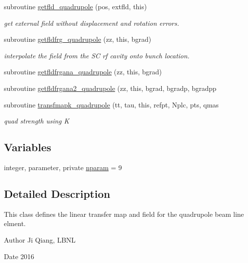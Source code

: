 \begin{DoxyCompactItemize}
subroutine \mbox{\hyperlink{namespacequadrupoleclass_a1d1bf0b4ea88a1cd0c0832a178fc80e5}{getfld\+\_\+quadrupole}} (pos, extfld, this)
\begin{DoxyCompactList}\small\item\em get external field without displacement and rotation errors. \end{DoxyCompactList}\item 
subroutine \mbox{\hyperlink{namespacequadrupoleclass_a28a961157d94669d59f8c6f024995899}{getfldfrg\+\_\+quadrupole}} (zz, this, bgrad)
\begin{DoxyCompactList}\small\item\em interpolate the field from the SC rf cavity onto bunch location. \end{DoxyCompactList}\item 
subroutine \mbox{\hyperlink{namespacequadrupoleclass_aac2c756ddd587ca842555670b0ad16b3}{getfldfrgana\+\_\+quadrupole}} (zz, this, bgrad)
\item 
subroutine \mbox{\hyperlink{namespacequadrupoleclass_ab1abe8916ad3dace3e5d1373da4688ac}{getfldfrgana2\+\_\+quadrupole}} (zz, this, bgrad, bgradp, bgradpp
\item 
subroutine \mbox{\hyperlink{namespacequadrupoleclass_a0a62a19a637c00cb1d985698e111b415}{transfmapk\+\_\+quadrupole}} (tt, tau, this, refpt, Nplc, pts, qmas
\begin{DoxyCompactList}\small\item\em quad strength using K \end{DoxyCompactList}\end{DoxyCompactItemize}
\subsection*{Variables}
\begin{DoxyCompactItemize}
\item 
integer, parameter, private \mbox{\hyperlink{namespacequadrupoleclass_a8eba81bd9796e431c21d0f46260b0c6c}{nparam}} = 9
\end{DoxyCompactItemize}


\subsection{Detailed Description}
This class defines the linear transfer map and field for the quadrupole beam line elment. 

\begin{DoxyAuthor}{Author}
Ji Qiang, L\+B\+NL 
\end{DoxyAuthor}
\begin{DoxyDate}{Date}
2016 
\end{DoxyDate}


